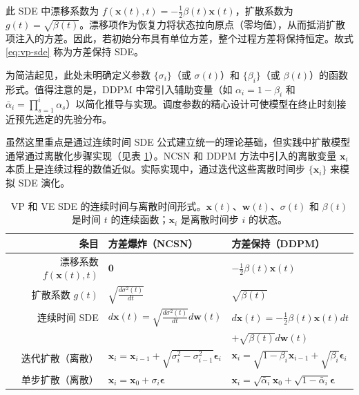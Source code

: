 此 SDE 中漂移系数为 $f(\mathbf{x}(t), t) = -\frac{1}{2} \beta(t) \mathbf{x}(t)$，扩散系数为 $g(t) = \sqrt{\beta(t)}$。漂移项作为恢复力将状态拉向原点（零均值），从而抵消扩散项注入的方差。因此，若初始分布具有单位方差，整个过程方差将保持恒定。故式 \eqref{eq:vp-sde} 称为方差保持 SDE。

为简洁起见，此处未明确定义参数 $\{\sigma_i\}$（或 $\sigma(t)$）和 $\{\beta_i\}$（或 $\beta(t)$）的函数形式。值得注意的是，DDPM 中常引入辅助变量（如 $\alpha_i = 1 - \beta_i$ 和 $\bar{\alpha}_i = \prod_{s=1}^i \alpha_s$）以简化推导与实现。调度参数的精心设计可使模型在终止时刻接近预先选定的先验分布。

虽然这里重点是通过连续时间 SDE 公式建立统一的理论基础，但实践中扩散模型通常通过离散化步骤实现（见表 \ref{tab:vp-and-ve-sdes}）。NCSN 和 DDPM 方法中引入的离散变量 $\mathbf{x}_i$ 本质上是连续过程的数值近似。实际实现中，通过迭代这些离散时间步 $\{\mathbf{x}_i\}$ 来模拟 SDE 演化。

\begin{table}[!t]
\centering
\begingroup
\renewcommand{\arraystretch}{1.3}
\small
\begin{tabular}{r | l | l}
条目 & 方差爆炸（NCSN） & 方差保持（DDPM） \\ \hline
漂移系数 $f(\mathbf{x}(t), t)$ & $\mathbf{0}$ & $-\frac{1}{2} \beta(t) \mathbf{x}(t)$ \\
扩散系数 $g(t)$ & $\sqrt{\frac{d\sigma^2(t)}{dt}}$ & $\sqrt{\beta(t)}$ \\
连续时间 SDE & $d\mathbf{x}(t) = \sqrt{\frac{d\sigma^2(t)}{dt}} d\mathbf{w}(t)$ & $d\mathbf{x}(t) = -\frac{1}{2} \beta(t) \mathbf{x}(t) d t$ \\
& & \hspace{1.25cm} $+ \sqrt{\beta(t)} d\mathbf{w}(t)$ \\ \hline
迭代扩散（离散） & $\mathbf{x}_i = \mathbf{x}_{i-1} + \sqrt{\sigma_i^2 - \sigma_{i-1}^2} \boldsymbol{\epsilon}_i$ & $\mathbf{x}_i = \sqrt{1 - \beta_i} \mathbf{x}_{i-1} + \sqrt{\beta_i} \boldsymbol{\epsilon}_i$ \\
单步扩散（离散） & $\mathbf{x}_i = \mathbf{x}_0 + \sigma_i \boldsymbol{\epsilon}$ & $\mathbf{x}_i = \sqrt{\bar{\alpha}_i} \mathbf{x}_0 + \sqrt{1 - \bar{\alpha}_i} \boldsymbol{\epsilon}$
\end{tabular}
\endgroup
\caption{VP 和 VE SDE 的连续时间与离散时间形式。$\mathbf{x}(t)$、$\mathbf{w}(t)$、$\sigma(t)$ 和 $\beta(t)$ 是时间 $t$ 的连续函数；$\mathbf{x}_i$ 是离散时间步 $i$ 的状态。}
\label{tab:vp-and-ve-sdes}
\end{table}






